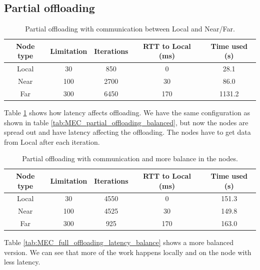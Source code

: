 \subsection{Partial offloading}




\begin{table}[h!]
    \centering
    \begin{tabular}[c]{|c|c|c|c|c|}
        \hline
        Node type & Limitation & Iterations & RTT to Local (ms)& Time used (s)\\
        \hline
        \hline
        Local & 30 & 850 & 0 & 28.1 \\
        \hline
        Near & 100 & 2700 & 30 & 86.0 \\
        \hline
        Far & 300 & 6450 & 170 & 1131.2 \\
        \hline
    \end{tabular}
    \caption{Partial offloading with communication between Local and Near/Far.}
    \label{tab:MEC_partial_offloading_latency}
\end{table}

Table \ref{tab:MEC_partial_offloading_latency} shows how latency affects offloading. We have the same configuration as shown in table \ref{tab:MEC_partial_offloading_balanced}, but now the nodes are spread out and have latency affecting the offloading. The nodes have to get data from Local after each iteration.

\begin{table}[h!]
    \centering
    \begin{tabular}[c]{|c|c|c|c|c|}
        \hline
        Node type & Limitation & Iterations & RTT to Local (ms)& Time used (s)\\
        \hline
        \hline
        Local & 30 & 4550 & 0 & 151.3  \\
        \hline
        Near & 100 & 4525 & 30 & 149.8 \\
        \hline
        Far & 300 & 925 & 170 & 163.0 \\
        \hline
    \end{tabular}
    \caption{Partial offloading with communication and more balance in the nodes.}
    \label{tab:MEC_partial_offloading_latency_balance}
\end{table}


Table \ref{tab:MEC_full_offloading_latency_balance} shows a more balanced version. We can see that more of the work happens locally and on the node with less latency.

